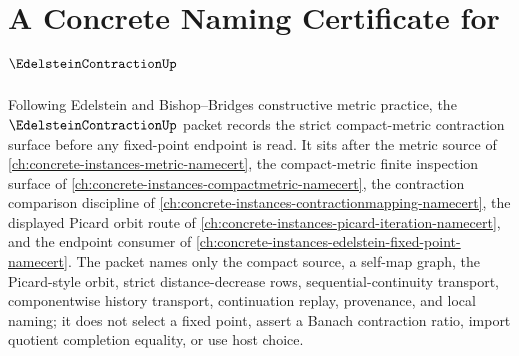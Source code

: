 \chapter{A Concrete Naming Certificate for $\EdelsteinContractionUp$}
\label{ch:concrete-instances-edelstein-contraction-namecert}

Following Edelstein and Bishop--Bridges constructive metric practice, the $\EdelsteinContractionUp$ packet records the strict compact-metric contraction surface before any fixed-point endpoint is read. It sits after the metric source of \autoref{ch:concrete-instances-metric-namecert}, the compact-metric finite inspection surface of \autoref{ch:concrete-instances-compactmetric-namecert}, the contraction comparison discipline of \autoref{ch:concrete-instances-contractionmapping-namecert}, the displayed Picard orbit route of \autoref{ch:concrete-instances-picard-iteration-namecert}, and the endpoint consumer of \autoref{ch:concrete-instances-edelstein-fixed-point-namecert}. The packet names only the compact source, a self-map graph, the Picard-style orbit, strict distance-decrease rows, sequential-continuity transport, componentwise history transport, continuation replay, provenance, and local naming; it does not select a fixed point, assert a Banach contraction ratio, import quotient completion equality, or use host choice.


